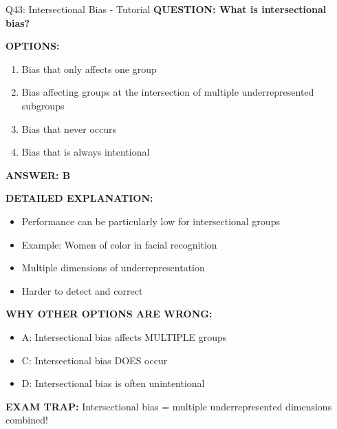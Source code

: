 \documentclass[8pt]{beamer}
\begin{document}
	\begin{frame}{Q43: Intersectional Bias - Tutorial}
		\fontsize{6.5}{7.5}\selectfont
		\textbf{QUESTION: What is intersectional bias?}
		
		\vspace{0.1cm}
		\textbf{OPTIONS:}
		\begin{enumerate}
			\item Bias that only affects one group
			\item Bias affecting groups at the intersection of multiple underrepresented subgroups
			\item Bias that never occurs
			\item Bias that is always intentional
		\end{enumerate}
		
		\vspace{0.1cm}
		\textcolor{myblue}{\textbf{ANSWER: B}}
		
		\vspace{0.1cm}
		\textbf{DETAILED EXPLANATION:}
		\begin{itemize}
			\item Performance can be particularly low for intersectional groups
			\item Example: Women of color in facial recognition
			\item Multiple dimensions of underrepresentation
			\item Harder to detect and correct
		\end{itemize}
		
		\vspace{0.1cm}
		\textcolor{myred}{\textbf{WHY OTHER OPTIONS ARE WRONG:}}
		\begin{itemize}
			\item \textcolor{myred}{A:} Intersectional bias affects MULTIPLE groups
			\item \textcolor{myred}{C:} Intersectional bias DOES occur
			\item \textcolor{myred}{D:} Intersectional bias is often unintentional
		\end{itemize}
		
		\textcolor{myred}{\textbf{EXAM TRAP:}} Intersectional bias = \textcolor{myblue}{multiple underrepresented dimensions combined}!
	\end{frame}
	
\end{document}
